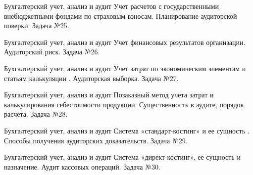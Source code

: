 \documentclass[
	11pt,
	a4paper,
	]
	{article}
\begin{document}
\begin{minipage}[t][\miniH]{\miniL}\centering
	 {Бухгалтерский учет, анализ и аудит}
		{
			Учет расчетов с государственными внебюджетными фондами по страховым взносам.
		}{
			Планирование аудиторской поверки.
		}{
			Задача №25.
		}
	\lowGE
\end{minipage}

\vfill



\begin{minipage}[t][\miniH]{\miniL}\centering
	 {Бухгалтерский учет, анализ и аудит}
		{
			Учет финансовых результатов организации.
		}{
			Аудиторский риск.
		}{
			Задача №26.
		}
	\lowGE
\end{minipage}

\vfill



\begin{minipage}[t][\miniH]{\miniL}\centering
	 {Бухгалтерский учет, анализ и аудит}
		{
			Учет затрат по экономическим элементам и статьям калькуляции .
		}{
			Аудиторская выборка.
		}{
			Задача №27.
		}
	\lowGE
\end{minipage}





\begin{minipage}[t][\miniH]{\miniL}\centering
	 {Бухгалтерский учет, анализ и аудит}
		{
			Позаказный метод учета затрат и калькулирования себестоимости продукции.
		}{
			Существенность в аудите, порядок расчета.
		}{
			Задача №28.
		}
	\lowGE
\end{minipage}

\vfill



\begin{minipage}[t][\miniH]{\miniL}\centering
	 {Бухгалтерский учет, анализ и аудит}
		{
			Система «стандарт-костинг» и ее сущность .
		}{
			Способы получения аудиторских доказательств.
		}{
			Задача №29.
		}
	\lowGE
\end{minipage}

\vfill



\begin{minipage}[t][\miniH]{\miniL}\centering
	 {Бухгалтерский учет, анализ и аудит}
		{
			Система «директ-костинг», ее сущность и назначение.
		}{
			Аудит кассовых операций.
		}{
			Задача №30.
		}
	\lowGE
\end{minipage}



	
\end{document}
